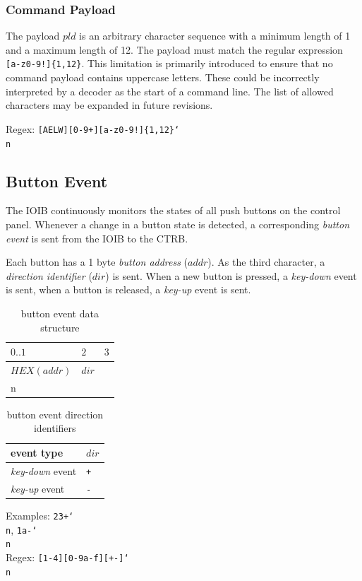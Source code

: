 \documentclass{scrreprt}
\newcommand\n{\char`\\n}
\begin{document}
\subsubsection{Command Payload}
The payload $pld$ is an arbitrary character sequence with a minimum length of 1 and a maximum length of 12.
The payload must match the regular expression \texttt{[a-z0-9!]\{1,12\}}.
This limitation is primarily introduced to ensure that no command payload contains uppercase letters.
These could be incorrectly interpreted by a decoder as the start of a command line.
The list of allowed characters may be expanded in future revisions.

Regex: \texttt{[AELW][0-9+][a-z0-9!]\{1,12\}\n}

\subsection{Button Event}
The IOIB continuously monitors the states of all push buttons on the control panel.
Whenever a change in a button state is detected, a corresponding \emph{button event} is sent from the IOIB to the CTRB.

Each button has a 1 byte \emph{button address} ($addr$).
As the third character, a \emph{direction identifier} ($dir$) is sent.
When a new button is pressed, a \emph{key-down} event is sent, when a button is released, a \emph{key-up} event is sent.

\begin{table}[h!]
\centering
\begin{tabular}{ |l|l|l| } 
\multicolumn{1}{l}{$0..1$} & \multicolumn{1}{l}{$2$} & \multicolumn{1}{l}{$3$} \\ \hline
$HEX(addr)$ & $dir$ & \texttt{\n} \\\hline
\end{tabular}
\caption{button event data structure}
\end{table}
\begin{table}[h!]
\centering
\begin{tabular}{ |l|l| } 
\hline
event type     & $dir$ \\\hline\hline
\emph{key-down} event & \texttt{+} \\\hline
\emph{key-up} event   & \texttt{-} \\\hline
\end{tabular}
\caption{button event direction identifiers}
\end{table}

Examples: \texttt{23+\n}, \texttt{1a-\n} \\
Regex: \texttt{[1-4][0-9a-f][+-]\n}
\end{document}
